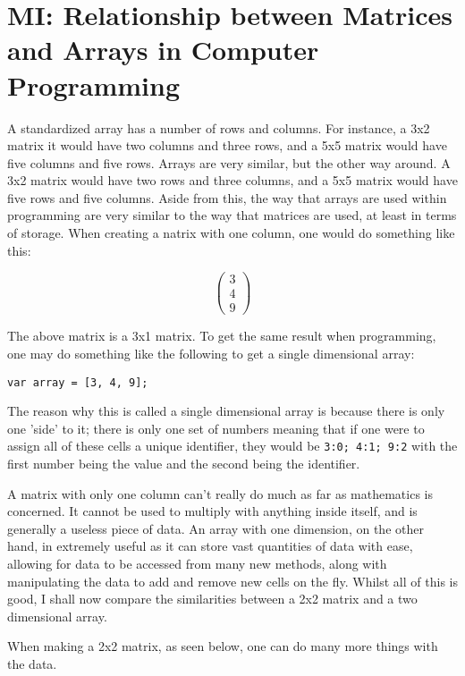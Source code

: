 \documentclass[a4paper,10pt]{article}
\begin{document}
    \newpage

    \section{MI: Relationship between Matrices and Arrays in Computer Programming}
      A standardized array has a number of rows and columns. For instance, a 3x2 matrix it would have two columns and three rows, and a 5x5 matrix would have five columns and five rows. Arrays are very similar, but the other way around. A 3x2 matrix would have two rows and three columns, and a 5x5 matrix would have five rows and five columns. Aside from this, the way that arrays are used within programming are very similar to the way that matrices are used, at least in terms of storage. When creating a natrix with one column, one would do something like this:

      \begin{equation*}
        \begin{pmatrix}
          3\\
          4\\
          9
        \end{pmatrix}
      \end{equation*}

      The above matrix is a 3x1 matrix. To get the same result when programming, one may do something like the following to get a single dimensional array:

      \texttt{var array = [3, 4, 9];}

      The reason why this is called a single dimensional array is because there is only one 'side' to it; there is only one set of numbers meaning that if one were to assign all of these cells a unique identifier, they would be \texttt{3:0; 4:1; 9:2} with the first number being the value and the second being the identifier.

      A matrix with only one column can't really do much as far as mathematics is concerned. It cannot be used to multiply with anything inside itself, and is generally a useless piece of data. An array with one dimension, on the other hand, in extremely useful as it can store vast quantities of data with ease, allowing for data to be accessed from many new methods, along with manipulating the data to add and remove new cells on the fly. Whilst all of this is good, I shall now compare the similarities between a 2x2 matrix and a two dimensional array.

      When making a 2x2 matrix, as seen below, one can do many more things with the data.
\end{document}
